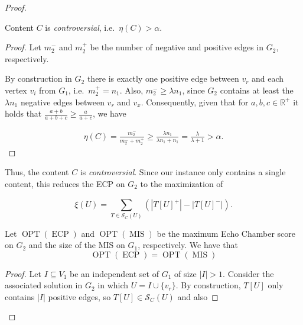 \begin{proof}
	\begin{claim}
		\label{th:claim-controversial}
		Content $C$ is \emph{controversial}, i.e.\ $\eta(C) > \alpha $.
	\end{claim}
	\begin{proof}
		Let $m_{2}^{-} $ and $m_{2}^{+} $ be the number of negative and
		positive edges in $G_2$, respectively.

		By construction in $G_2$ there is exactly one
		positive edge between $v_r$ and each vertex $v_i$ from $ G_1$, i.e.\
		$m_{2}^{+} = n_{1} $. Also,
		$m_{2}^{-} \geq \lambda n_{1} $, since $G_2$ contains at least the $\lambda
			n_1$ negative edges between $v_r$ and $v_x$. Consequently, given that for $a, b, c \in \mathbb{R}^{+}$ it holds that $\frac{a +
				b}{a + b + c} \geq \frac{a}{a + c} $, we have

		\begin{align}
			\eta(C) = \frac{m_{2}^{-} }{m_{2}^{-} +
				m_{2}^{+} } \geq \frac{\lambda n_{1}}{\lambda n_{1}
				+ n_{1} } = \frac{\lambda }{\lambda + 1} > \alpha.
		\end{align}
	\end{proof}

	Thus, the content $C$ is \emph{controversial}. Since our instance only contains
	a single content, this reduces the \acrshort{ECP} on $G_2$ to the maximization of

	\begin{equation}
		\label{eq:score}
		\xi(U) = \sum^{}_{T \in \mathcal{S}_C(U) } (| T[U]^{+} | - | T[U]^{-} |).
	\end{equation}

	\bigskip

	\begin{claim}
		\label{th:opt-equality}
		Let $\operatorname{OPT}(\operatorname{ECP})$ and
		$\operatorname{OPT}(\operatorname{MIS})$ be the maximum Echo Chamber score on
		$G_2$ and the size of the MIS on $G_1$, respectively.
		We have that
		\begin{equation}
			\operatorname{OPT}(\operatorname{ECP}) = \operatorname{OPT}(\operatorname{MIS})
		\end{equation}
	\end{claim}

	\begin{proof}
		Let $I \subseteq V_{1} $ be an independent set of $G_1$ of size $|I| >
			1$. Consider the associated solution in $G_2$ in which $U = I \cup
			\{v_{r} \}$. By construction, $T[U]$ only contains $|I|$ positive
		edges, so $T[U] \in \mathcal{S}_C(U)$ and also


\end{proof}
\end{proof}
